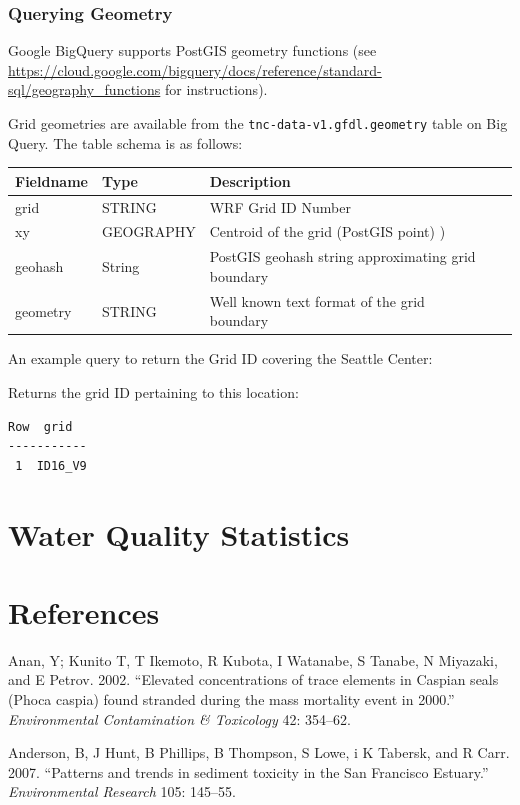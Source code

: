 \documentclass[
]{report}
\begin{document}
\hypertarget{querying-geometry}{%
\subsection{Querying Geometry}\label{querying-geometry}}

Google BigQuery supports PostGIS geometry functions (see \url{https://cloud.google.com/bigquery/docs/reference/standard-sql/geography_functions} for instructions).

Grid geometries are available from the \texttt{tnc-data-v1.gfdl.geometry} table on Big Query. The table schema is as follows:

\begin{longtable}[]{@{}lllll@{}}
\toprule
Fieldname & Type & Description & &\tabularnewline
\midrule
\endhead
grid & STRING & WRF Grid ID Number & &\tabularnewline
xy & GEOGRAPHY & Centroid of the grid (PostGIS point) ) & &\tabularnewline
geohash & String & PostGIS geohash string approximating grid boundary & &\tabularnewline
geometry & STRING & Well known text format of the grid boundary & &\tabularnewline
\bottomrule
\end{longtable}

An example query to return the Grid ID covering the Seattle Center:

Returns the grid ID pertaining to this location:

\begin{verbatim}
Row  grid
-----------
 1  ID16_V9
\end{verbatim}

\hypertarget{water-quality-statistics}{%
\chapter{Water Quality Statistics}\label{water-quality-statistics}}

\hypertarget{references}{%
\chapter{References}\label{references}}

\hypertarget{refs}{}
\leavevmode\hypertarget{ref-Anan2002}{}%
Anan, Y; Kunito T, T Ikemoto, R Kubota, I Watanabe, S Tanabe, N Miyazaki, and E Petrov. 2002. ``Elevated concentrations of trace elements in Caspian seals (Phoca caspia) found stranded during the mass mortality event in 2000.'' \emph{Environmental Contamination \& Toxicology} 42: 354--62.

\leavevmode\hypertarget{ref-Anderson2007}{}%
Anderson, B, J Hunt, B Phillips, B Thompson, S Lowe, i K Tabersk, and R Carr. 2007. ``Patterns and trends in sediment toxicity in the San Francisco Estuary.'' \emph{Environmental Research} 105: 145--55.
\end{document}

